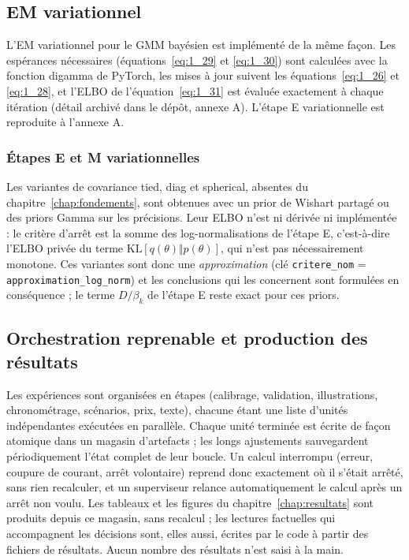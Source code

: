 \subsection{EM variationnel}\label{sec:impl_vb}
L'EM variationnel pour le GMM bayésien est implémenté de la même façon. Les espérances nécessaires (équations~\ref{eq:1_29} et \ref{eq:1_30}) sont calculées avec la fonction digamma de PyTorch, les mises à jour suivent les équations~\eqref{eq:1_26} et \eqref{eq:1_28}, et l'ELBO de l'équation~\eqref{eq:1_31} est évaluée exactement à chaque itération (détail archivé dans le dépôt, annexe A). L'étape E variationnelle est reproduite à l'annexe A.

\subsubsection*{Étapes E et M variationnelles}
Les variantes de covariance tied, diag et spherical, absentes du chapitre~\ref{chap:fondements}, sont obtenues avec un prior de Wishart partagé ou des priors Gamma sur les précisions. Leur ELBO n'est ni dérivée ni implémentée : le critère d'arrêt est la somme des log-normalisations de l'étape E, c'est-à-dire l'ELBO privée du terme $\mathrm{KL}[q(\theta)\Vert p(\theta)]$, qui n'est pas nécessairement monotone. Ces variantes sont donc une \emph{approximation} (clé \texttt{critere\_nom} = \texttt{approximation\_log\_norm}) et les conclusions qui les concernent sont formulées en conséquence ; le terme $D/\beta_k$ de l'étape E reste exact pour ces priors.

\subsection{Orchestration reprenable et production des résultats}\label{sec:architecture}
Les expériences sont organisées en étapes (calibrage, validation, illustrations, chronométrage, scénarios, prix, texte), chacune étant une liste d'unités indépendantes exécutées en parallèle. Chaque unité terminée est écrite de façon atomique dans un magasin d'artefacts ; les longs ajustements sauvegardent périodiquement l'état complet de leur boucle. Un calcul interrompu (erreur, coupure de courant, arrêt volontaire) reprend donc exactement où il s'était arrêté, sans rien recalculer, et un superviseur relance automatiquement le calcul après un arrêt non voulu. Les tableaux et les figures du chapitre~\ref{chap:resultats} sont produits depuis ce magasin, sans recalcul ; les lectures factuelles qui accompagnent les décisions sont, elles aussi, écrites par le code à partir des fichiers de résultats. Aucun nombre des résultats n'est saisi à la main.

